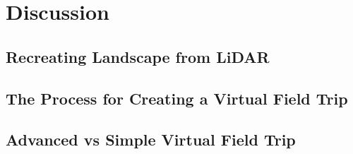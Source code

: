 \chapter{Discussion}
\label{chap:discussion}

\section{Recreating Landscape from LiDAR}

\section{The Process for Creating a Virtual Field Trip}

\section{Advanced vs Simple Virtual Field Trip}

